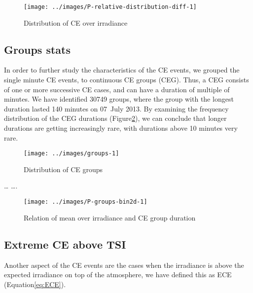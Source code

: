 \documentclass[preprint, 3p,
authoryear]{elsarticle} %
\begin{document}
\begin{figure}

{\centering \texttt{[image: ../images/P-relative-distribution-diff-1]} 

}

\caption{Distribution of CE over irradiance}\label{fig:ovir-distribution}
\end{figure}

\hypertarget{groups-stats}{%
\subsection{Groups stats}\label{groups-stats}}

In order to further study the characteristics of the CE events, we
grouped the single minute CE events, to continuous CE groups (CEG).
Thus, a CEG consists of one or more successive CE cases, and can have a
duration of multiple of minutes. We have identified 30749 groups, where
the group with the longest duration lasted 140 minutes on 07~July 2013.
By examining the frequency distribution of the CEG durations
(Figure\nobreakspace{}\ref{fig:ceg-duration-distribution}), we can
conclude that longer durations are getting increasingly rare, with
durations above 10 minutes very rare.

\begin{figure}

{\centering \texttt{[image: ../images/groups-1]} 

}

\caption{Distribution of CE groups}\label{fig:ceg-duration-distribution}
\end{figure}

\ldots{} \citet{Zhang2018} \ldots.

\begin{figure}

{\centering \texttt{[image: ../images/P-groups-bin2d-1]} 

}

\caption{Relation of mean over irradiance and CE group duration}\label{fig:unnamed-chunk-3}
\end{figure}

\hypertarget{extreme-ce-above-tsi}{%
\subsection{Extreme CE above TSI}\label{extreme-ce-above-tsi}}

Another aspect of the CE events are the cases when the irradiance is
above the expected irradiance on top of the atmosphere, we have defined
this as ECE (Equation\nobreakspace{}\ref{eq:ECE}).
\end{document}
